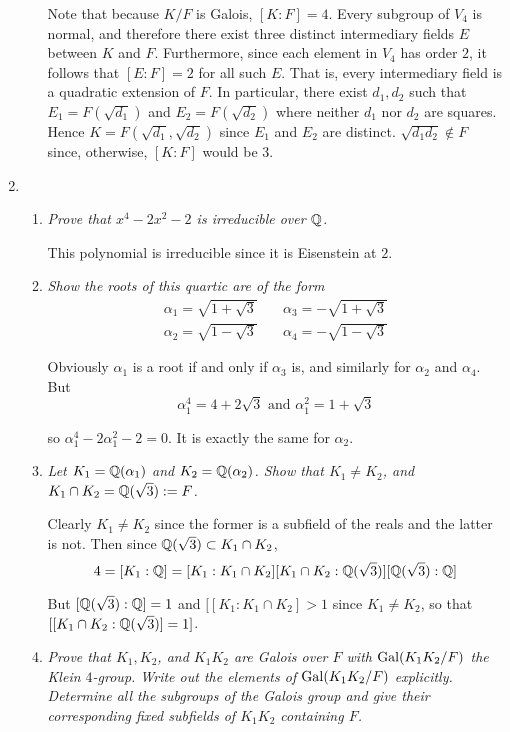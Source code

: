 \documentclass[10pt]{article}
\begin{document}
\begin{enumerate}
\begin{enumerate}
Note that because $K/F$ is Galois, $[K:F] = 4$.  Every subgroup of $V_4$ is normal, and therefore there exist three distinct intermediary fields $E$ between $K$ and $F$.  Furthermore, since each element in $V_4$ has order $2$, it follows that $[E:F] = 2$ for all such $E$.  That is, every intermediary field is a quadratic extension of $F$.  In particular, there exist $d_1, d_2$ such that $E_1 = F(\sqrt{d_1})$ and $E_2 = F(\sqrt{d_2})$ where neither $d_1$ nor $d_2$ are squares.  Hence $K = F(\sqrt{d_1}, \sqrt{d_2})$ since $E_1$ and $E_2$ are distinct.  $\sqrt{d_1d_2} \notin F$ since, otherwise, $[K:F]$ would be $3$.

\end{enumerate}

\item
\begin{enumerate}
\item \emph{Prove that $x^4 - 2x^2 - 2$ is irreducible over $\mathbb{Q}$.}

This polynomial is irreducible since it is Eisenstein at $2$.

\item \emph{Show the roots of this quartic are of the form
\begin{align*}
\alpha_1 = \sqrt{1+\sqrt{3}} & \quad \alpha_3 = -\sqrt{1+\sqrt{3}} \\
\alpha_2 = \sqrt{1-\sqrt{3}} & \quad \alpha_4 = -\sqrt{1-\sqrt{3}}
\end{align*}}

Obviously $\alpha_1$ is a root if and only if $\alpha_3$ is, and similarly for $\alpha_2$ and $\alpha_4$.  But
\[
\alpha_1^4 = 4 + 2\sqrt{3} \mbox{ and } \alpha_1^2 = 1 + \sqrt{3}
\]

so $\alpha_1^4 - 2\alpha_1^2 - 2 = 0$.  It is exactly the same for $\alpha_2$.

\item \emph{Let $K_1 = \mathbb{Q}(\alpha_1)$ and $K_2 = \mathbb{Q}(\alpha_2)$.  Show that $K_1 \neq K_2$, and $K_1 \cap K_2 = \mathbb{Q}(\sqrt{3}) := F$.}

Clearly $K_1 \neq K_2$ since the former is a subfield of the reals and the latter is not.  Then since $\mathbb{Q}(\sqrt{3}) \subset K_1 \cap K_2$,
\[
4 = [K_1: \mathbb{Q}] = [K_1:K_1 \cap K_2][K_1 \cap K_2:\mathbb{Q}(\sqrt{3})][\mathbb{Q}(\sqrt{3}):\mathbb{Q}]
\]

But $[\mathbb{Q}(\sqrt{3}):\mathbb{Q}] = 1$ and $[[K_1:K_1 \cap K_2] > 1$ since $K_1 \neq K_2$, so that $[[K_1 \cap K_2:\mathbb{Q}(\sqrt{3})] = 1]$.

\item \emph{Prove that $K_1, K_2$, and $K_1K_2$ are Galois over $F$ with $\operatorname{Gal}(K_1K_2/F)$ the Klein $4$-group.  Write out the elements of $\operatorname{Gal}(K_1K_2/F)$ explicitly.  Determine all the subgroups of the Galois group and give their corresponding fixed subfields of $K_1K_2$ containing $F$.}


\end{enumerate}
\end{enumerate}
\end{document}
